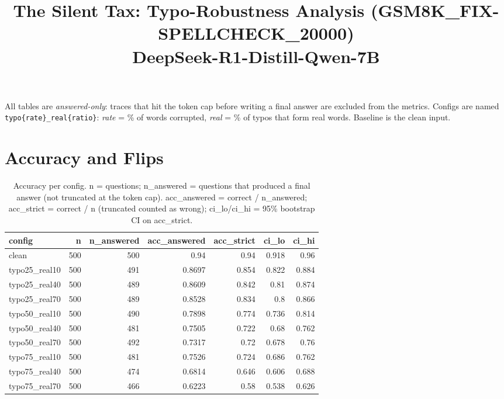 \documentclass[11pt]{article}
\title{The Silent Tax: Typo-Robustness Analysis (GSM8K\_FIX-SPELLCHECK\_20000)\\\large DeepSeek-R1-Distill-Qwen-7B}
\date{}
\begin{document}
\maketitle
\noindent All tables are \emph{answered-only}: traces that hit the token cap before writing a final answer are excluded from the metrics. Configs are named \texttt{typo\{rate\}\_real\{ratio\}}: \emph{rate} = \% of words corrupted, \emph{real} = \% of typos that form real words. Baseline is the clean input.

\section*{Accuracy and Flips}
\begin{table}[H]
\centering
\caption{Accuracy per config. n = questions; n\_answered = questions that produced a final answer (not truncated at the token cap). acc\_answered = correct / n\_answered; acc\_strict = correct / n (truncated counted as wrong); ci\_lo/ci\_hi = 95\% bootstrap CI on acc\_strict.}
\small
\begin{adjustbox}{max width=\textwidth}
\begin{tabular}{lrrrrrr}
\toprule
\textbf{config} & \textbf{n} & \textbf{n\_answered} & \textbf{acc\_answered} & \textbf{acc\_strict} & \textbf{ci\_lo} & \textbf{ci\_hi} \\
\midrule
clean & 500 & 500 & 0.94 & 0.94 & 0.918 & 0.96 \\
typo25\_real10 & 500 & 491 & 0.8697 & 0.854 & 0.822 & 0.884 \\
typo25\_real40 & 500 & 489 & 0.8609 & 0.842 & 0.81 & 0.874 \\
typo25\_real70 & 500 & 489 & 0.8528 & 0.834 & 0.8 & 0.866 \\
typo50\_real10 & 500 & 490 & 0.7898 & 0.774 & 0.736 & 0.814 \\
typo50\_real40 & 500 & 481 & 0.7505 & 0.722 & 0.68 & 0.762 \\
typo50\_real70 & 500 & 492 & 0.7317 & 0.72 & 0.678 & 0.76 \\
typo75\_real10 & 500 & 481 & 0.7526 & 0.724 & 0.686 & 0.762 \\
typo75\_real40 & 500 & 474 & 0.6814 & 0.646 & 0.606 & 0.688 \\
typo75\_real70 & 500 & 466 & 0.6223 & 0.58 & 0.538 & 0.626 \\
\bottomrule
\end{tabular}
\end{adjustbox}
\end{table}
\end{document}
